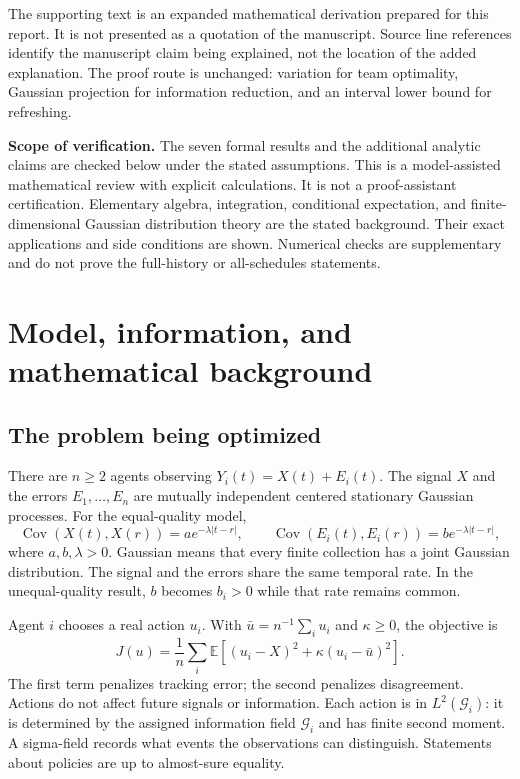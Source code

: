 \documentclass[12pt,letterpaper]{article}
\newcommand{\E}{\mathbb E}
\newcommand{\Cov}{\operatorname{Cov}}
\newcommand{\G}{\mathcal G}
\begin{document}
The supporting text is an expanded mathematical derivation prepared for this report. It is not presented as a quotation of the manuscript. Source line references identify the manuscript claim being explained, not the location of the added explanation. The proof route is unchanged: variation for team optimality, Gaussian projection for information reduction, and an interval lower bound for refreshing.

\textbf{Scope of verification.} The seven formal results and the additional analytic claims are checked below under the stated assumptions. This is a model-assisted mathematical review with explicit calculations. It is not a proof-assistant certification. Elementary algebra, integration, conditional expectation, and finite-dimensional Gaussian distribution theory are the stated background. Their exact applications and side conditions are shown. Numerical checks are supplementary and do not prove the full-history or all-schedules statements.

\section{Model, information, and mathematical background}
\subsection{The problem being optimized}
There are $n\ge2$ agents observing $Y_i(t)=X(t)+E_i(t)$. The signal $X$ and the errors $E_1,\ldots,E_n$ are mutually independent centered stationary Gaussian processes. For the equal-quality model,
\[
\Cov(X(t),X(r))=a e^{-\lambda|t-r|},\qquad
\Cov(E_i(t),E_i(r))=b e^{-\lambda|t-r|},
\]
where $a,b,\lambda>0$. Gaussian means that every finite collection has a joint Gaussian distribution. The signal and the errors share the same temporal rate. In the unequal-quality result, $b$ becomes $b_i>0$ while that rate remains common.

Agent $i$ chooses a real action $u_i$. With $\bar u=n^{-1}\sum_i u_i$ and $\kappa\ge0$, the objective is
\[
J(u)=\frac1n\sum_i\E[(u_i-X)^2+\kappa(u_i-\bar u)^2].
\]
The first term penalizes tracking error; the second penalizes disagreement. Actions do not affect future signals or information. Each action is in $L^2(\G_i)$: it is determined by the assigned information field $\G_i$ and has finite second moment. A sigma-field records what events the observations can distinguish. Statements about policies are up to almost-sure equality.
\end{document}
